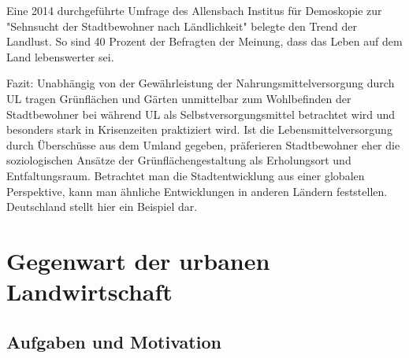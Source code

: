 \documentclass{scrartcl}
\begin{document}
Eine 2014 durchgeführte Umfrage des Allensbach Institus für Demoskopie zur "Sehnsucht der Stadtbewohner nach Ländlichkeit" belegte den Trend der Landlust. So sind 40 Prozent der Befragten der Meinung, dass das Leben auf dem Land lebenswerter sei. 

Fazit: Unabhängig von der Gewährleistung der Nahrungsmittelversorgung durch UL tragen Grünflächen und Gärten unmittelbar zum Wohlbefinden der Stadtbewohner bei während UL als Selbstversorgungsmittel betrachtet wird und besonders stark in Krisenzeiten praktiziert wird. Ist die Lebensmittelversorgung durch Überschüsse aus dem Umland gegeben, präferieren Stadtbewohner eher die soziologischen Ansätze der Grünflächengestaltung als Erholungsort und Entfaltungsraum. Betrachtet man die Stadtentwicklung aus einer globalen Perspektive, kann man ähnliche Entwicklungen in anderen Ländern feststellen. Deutschland stellt hier ein Beispiel dar.

\section{Gegenwart der urbanen Landwirtschaft}
\subsection{Aufgaben und Motivation}
\end{document}
